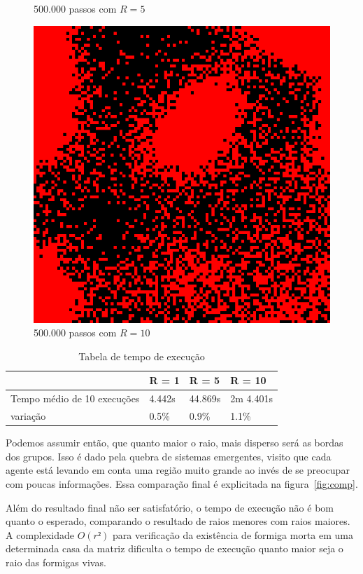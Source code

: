 \documentclass[conference]{IEEEtran}
\begin{document}
\begin{figure}[h]
\begin{minipage}[b]{0.5\linewidth}
    \caption{500.000 passos com $R=5$} 
    \vspace{4ex}
  \end{minipage} 
  \begin{minipage}[b]{0.5\linewidth}
    \centering
    \includegraphics[width=.8\linewidth]{resultados/10-6.png} 
    \caption{500.000 passos com $R=10$} 
    \vspace{4ex}
  \end{minipage}%
\end{figure}

\begin{table}[H]
\centering
\caption{Tabela de tempo de execução}
\label{table}
\begin{tabular}{|l|l|l|l|}
\hline
                            & R = 1  & R = 5   & R = 10    \\ \hline
Tempo médio de 10 execuções & 4.442s & 44.869s & 2m 4.401s \\ \hline
variação                    & 0.5\%  & 0.9\%   & 1.1\%     \\ \hline
\end{tabular}
\end{table}

Podemos assumir então, que quanto maior o raio, mais disperso será as bordas dos grupos. Isso é dado pela quebra de sistemas emergentes, visito que cada agente está levando em conta uma região muito grande ao invés de se preocupar com poucas informações. Essa comparação final é explicitada na figura~\ref{fig:comp}.

Além do resultado final não ser satisfatório, o tempo de execução não é bom quanto o esperado, comparando o resultado de raios menores com raios maiores. A complexidade $O(r²)$ para verificação da existência de formiga morta em uma determinada casa da matriz dificulta o tempo de execução quanto maior seja o raio das formigas vivas. 
\end{document}
